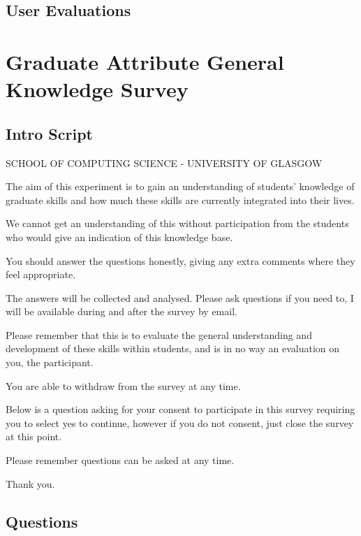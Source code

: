 \documentclass{l4proj}
\begin{document}
\begin{appendices}
\subsection{User Evaluations}



%

\section{Graduate Attribute General Knowledge Survey} \label{Appendix-gradAttributeSurvey}

\subsection{Intro Script}

SCHOOL OF COMPUTING SCIENCE - UNIVERSITY OF GLASGOW

The aim of this experiment is to gain an understanding of students' knowledge of graduate skills and how much these skills are currently integrated into their lives. 

We cannot get an understanding of this without participation from the students who would give an indication of this knowledge base. 

You should answer the questions honestly, giving any extra comments where they feel appropriate.

The answers will be collected and analysed. Please ask questions if you need to, I will be available during and after the survey by email.

Please remember that this is to evaluate the general understanding and development of these skills within students, and is in no way an evaluation on you, the participant.

You are able to withdraw from the survey at any time.

Below is a question asking for your consent to participate in this survey requiring you to select yes to continue, however if you do not consent, just close the survey at this point.

Please remember questions can be asked at any time.

Thank you.

\subsection{Questions}


\end{appendices}
\end{document}
